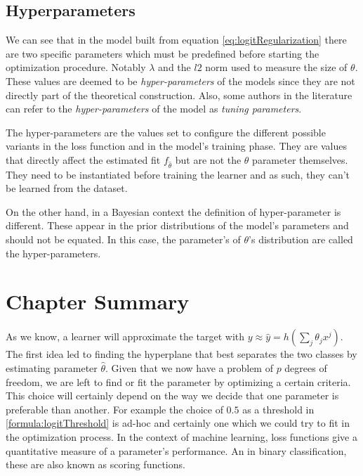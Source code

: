 \subsection{Hyperparameters}

We can see that in the model built from equation \cref{eq:logitRegularization} there are two specific parameters which must be predefined before starting the optimization procedure.
Notably $\lambda$ and the $l2$ norm used to measure the size of $\theta$.
These values are deemed to be \textit{hyper-parameters} of the models since they are not directly part of the theoretical construction.
Also, some authors in the literature can refer to the \textit{hyper-parameters} of the model as \textit{tuning parameters}.

The hyper-parameters are the values set to configure the different possible variants in the loss function and in the model's training phase.
They are values that directly affect the estimated fit $f_{\hat{\theta}}$ but are not the $\theta$ parameter themselves.
They need to be instantiated before training the learner and as such, they can't be learned from the dataset.

On the other hand, in a Bayesian context the definition of hyper-parameter is different.
These appear in the prior distributions of the model's parameters and should not be equated.
In this case, the parameter's of $\theta$'s distribution are called the hyper-parameters.



\section{Chapter Summary}\label{section-ch_machine_learning_summary}


As we know, a learner will approximate the target with $y \approx \hat{y} = h\left(\sum_{j}\theta_j x^j\right)$.
The first idea led to finding the hyperplane that best separates the two classes by estimating parameter $\hat{\theta}$.
Given that we now have a problem of $p$ degrees of freedom, we are left to find or fit the parameter by optimizing a certain criteria.
This choice will certainly depend on the way we decide that one parameter is preferable than another.
For example the choice of $0.5$ as a threshold in \cref{formula:logitThreshold} is ad-hoc and certainly one which we could try to fit in the optimization process.
In the context of machine learning, loss functions give a quantitative measure of a parameter's performance.
An in binary classification, these are also known as scoring functions.

